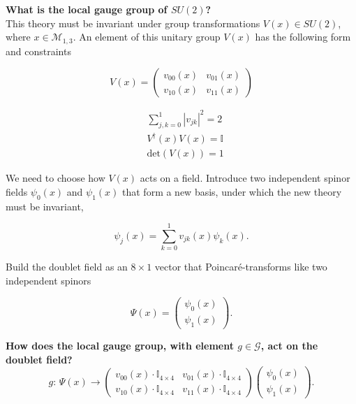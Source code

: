 \documentclass[10pt]{article}
\begin{document}
\noindent \textbf{What is the local gauge group of $SU(2)$?} \\

\noindent This theory must be invariant under group transformations $V(x) \in SU(2)$, where $x \in \mathcal{M}_{1,3}$. An element of this unitary group $V(x)$ has the following form and constraints

\begin{equation}
V(x) = \left(
\begin{array}{cc}
v_{00} (x) & v_{01} (x) \\
v_{10} (x) & v_{11} (x)
\end{array} \right)
\end{equation}

\begin{align*}
&\sum_{j,k=0}^1 |v_{jk}|^2 = 2 \\
& V^\dagger (x) V (x) = \mathbb{I} \\
& \text{det}(V(x)) = 1
\end{align*}

\noindent We need to choose how $V(x)$ acts on a field. Introduce two independent spinor fields $\psi_0 (x)$ and $\psi_1 (x)$ that form a new basis, under which the new theory must be invariant,

\begin{equation}
\psi_j (x) = \sum_{k=0}^1 v_{jk} (x) \psi_k (x).
\end{equation}

\noindent Build the doublet field as an $8 \times 1$ vector that Poincar\'e-transforms like two independent spinors

\begin{equation}
\Psi (x) = \left( \begin{array}{c} \psi_0 (x) \\ \psi_1 (x) \end{array} \right).
\end{equation}

\noindent \textbf{How does the local gauge group, with element $g \in \mathcal{G}$, act on the doublet field?} \\

\begin{equation}
g: \, \Psi (x) \rightarrow 
\left( \begin{array}{cc}
v_{00} (x) \cdot \mathbb{I}_{4 \times 4} & v_{01} (x) \cdot \mathbb{I}_{4 \times 4} \\
v_{10} (x) \cdot \mathbb{I}_{4 \times 4} & v_{11} (x) \cdot \mathbb{I}_{4 \times 4}
\end{array} \right)
\left( \begin{array}{c} \psi_0 (x) \\ \psi_1 (x) \end{array} \right).
\end{equation}
\end{document}
